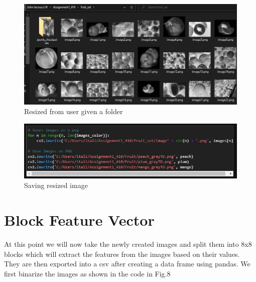 \documentclass[conference]{IEEEtran}
\begin{document}
\begin{figure}[h]
  \centering
  \includegraphics[width=\linewidth]{fruit_set_pic.png}
  \caption{Resized from user given a folder}
\end{figure}

\begin{figure}[h]
  \centering
  \includegraphics[width=\linewidth]{resize_save.png}
  \caption{Saving resized image}
\end{figure}

\section{Block Feature Vector}
At this point we will now take the newly created images and split them into 8x8 blocks which will extract the features from the images based on their values. They are then exported into a csv after creating a data frame using pandas.
We first binarize the images as shown in the code in Fig.8
\end{document}
